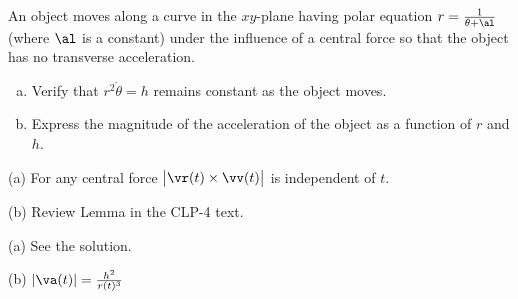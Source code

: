 \begin{question}[M317 2000A] %
An object moves along a curve in the $xy$-plane having polar
equation $r=\frac{1}{\theta+\al}$ (where $\al$ is a constant) under the influence
of a central force so that the object has no transverse acceleration.
\begin{enumerate}[(a)]
\item
Verify that $r^2\dot\theta=h$ remains constant as the object
moves.
\item
Express the magnitude of the acceleration of the object as
a function of $r$ and $h$.
\end{enumerate}

\end{question}

\begin{hint} 
(a) For any central force $\big|\vr(t)\times\vv(t)\big|$ is independent of $t$.

(b) Review Lemma  in the CLP-4 text.
\end{hint}

\begin{answer}
(a) See the solution.

(b) $|\va(t)| =\frac{h^2}{r(t)^3}$
\end{answer}

